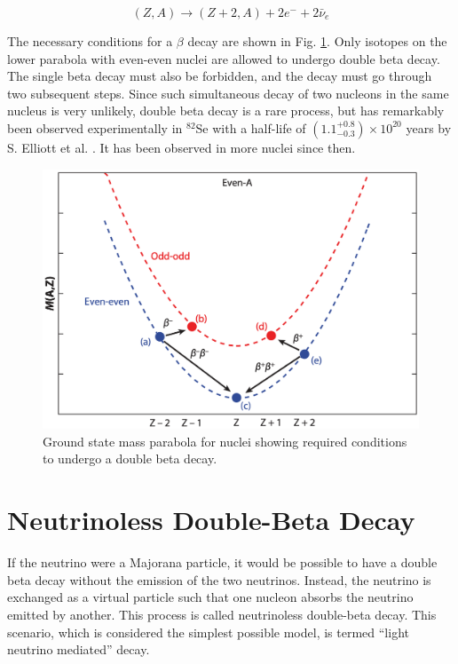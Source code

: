 \begin{equation}\label{beta_decay_eq}
(Z,A) \rightarrow (Z+2,A) + 2e^- + 2\bar{\nu}_e
\end{equation}



The necessary conditions for a $\beta$ decay are shown in Fig. \ref{2nbb_cond}. Only isotopes on the lower parabola with even-even nuclei are allowed to undergo double beta decay. The single beta decay must also be forbidden, and the decay must go through two subsequent steps. Since such simultaneous decay of two nucleons in the same nucleus is very unlikely, double beta decay is a rare process, but has remarkably been observed experimentally in $^{82}$Se with a half-life of $(1.1^{+0.8}_{-0.3})\times 10^{20}$ years by S. Elliott et al. \cite{PhysRevLett.59.2020}. It has been observed in more nuclei since then.

\begin{figure}
\centering
\includegraphics[width=0.8\linewidth]{ch1/figs/2nbb_cond.png}
\caption{Ground state mass parabola for nuclei showing required conditions to undergo a double beta decay. \cite{2nbb_cond}}
\label{2nbb_cond}
\end{figure}

\section{Neutrinoless Double-Beta Decay}
If the neutrino were a Majorana particle, it would be possible to have a double beta decay without the emission of the two neutrinos. Instead, the neutrino is exchanged as a virtual particle such that one nucleon absorbs the neutrino emitted by another. This process is called neutrinoless double-beta decay. This scenario, which is considered the simplest possible model, is termed ``light neutrino mediated'' decay.




